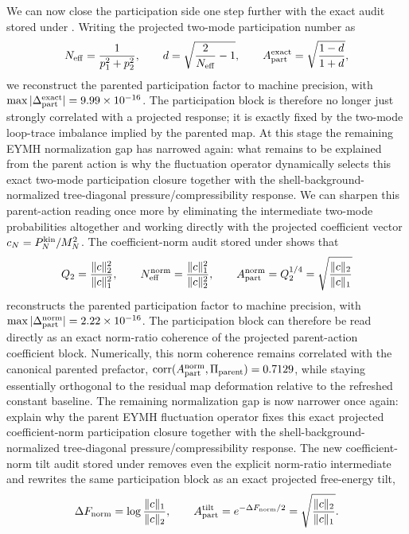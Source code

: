 \documentclass[aps,prd,onecolumn,notitlepage,nofootinbib,superscriptaddress,11pt,floatfix]{revtex4-2}
\begin{document}
We can now close the participation side one step further with the exact audit stored under . Writing the projected two-mode participation number as
\[
N_{\rm eff}=\frac{1}{p_1^2+p_2^2},
\qquad
d=\sqrt{\frac{2}{N_{\rm eff}}-1},
\qquad
A_{\rm part}^{\rm exact}=\sqrt{\frac{1-d}{1+d}},
\]
we reconstruct the parented participation factor to machine precision, with $\max|\Delta_{\rm part}^{\rm exact}|=9.99\times10^{-16}$. The participation block is therefore no longer just strongly correlated with a projected response; it is exactly fixed by the two-mode loop-trace imbalance implied by the parented map. At this stage the remaining EYMH normalization gap has narrowed again: what remains to be explained from the parent action is why the fluctuation operator dynamically selects this exact two-mode participation closure together with the shell-background-normalized tree-diagonal pressure/compressibility response.
We can sharpen this parent-action reading once more by eliminating the intermediate two-mode probabilities altogether and working directly with the projected coefficient vector $c_N=P_N^{\rm kin}/M_N^2$. The coefficient-norm audit stored under  shows that
\[
Q_2=\frac{\|c\|_2^2}{\|c\|_1^2},
\qquad
N_{\rm eff}^{\rm norm}=\frac{\|c\|_1^2}{\|c\|_2^2},
\qquad
A_{\rm part}^{\rm norm}=Q_2^{1/4}=\sqrt{\frac{\|c\|_2}{\|c\|_1}}
\]
reconstructs the parented participation factor to machine precision, with $\max|\Delta_{\rm part}^{\rm norm}|=2.22\times10^{-16}$. The participation block can therefore be read directly as an exact norm-ratio coherence of the projected parent-action coefficient block. Numerically, this norm coherence remains correlated with the canonical parented prefactor, $\mathrm{corr}(A_{\rm part}^{\rm norm},\Pi_{\rm parent})=0.7129$, while staying essentially orthogonal to the residual map deformation relative to the refreshed constant baseline. The remaining normalization gap is now narrower once again: explain why the parent EYMH fluctuation operator fixes this exact projected coefficient-norm participation closure together with the shell-background-normalized tree-diagonal pressure/compressibility response.
The new coefficient-norm tilt audit stored under  removes even the explicit norm-ratio intermediate and rewrites the same participation block as an exact projected free-energy tilt,
\[
\Delta F_{\rm norm}=\log\frac{\|c\|_1}{\|c\|_2},
\qquad
A_{\rm part}^{\rm tilt}=e^{-\Delta F_{\rm norm}/2}=\sqrt{\frac{\|c\|_2}{\|c\|_1}}.
\]
\end{document}
